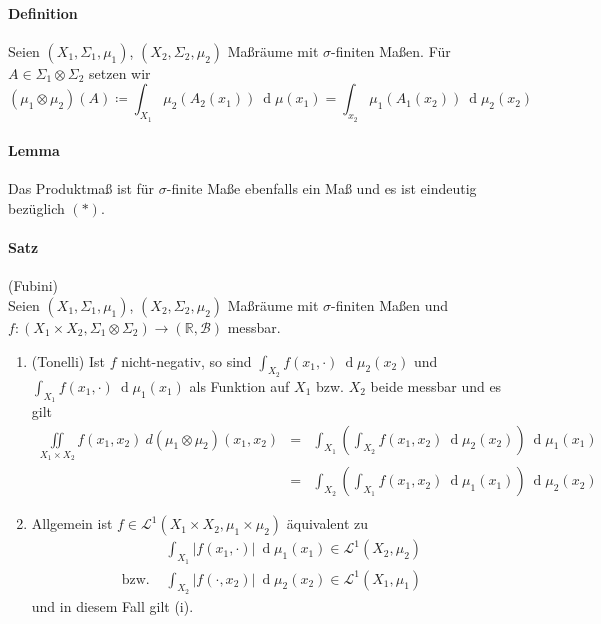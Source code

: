 \documentclass[12pt,a4paper,fleqn]{article}
\def\d{{\operatorname{d}}}
\begin{document}
\paragraph{Definition} Seien $(X_1, \Sigma_1, \mu_1)$, $(X_2, \Sigma_2, \mu_2)$ Maßräume mit $\sigma$-finiten Maßen. Für $A \in \Sigma_1 \otimes \Sigma_2$ setzen wir 
\begin{displaymath}
(\mu_1 \otimes \mu_2)(A) \coloneqq \int_{X_1} \mu_2(A_2(x_1))\ \d\mu(x_1) = \int_{x_2} \mu_1(A_1(x_2))\ \d\mu_2(x_2)
\end{displaymath}

\paragraph{Lemma} Das Produktmaß ist für $\sigma$-finite Maße ebenfalls ein Maß und es ist eindeutig bezüglich $(*)$.

\paragraph{Satz} (Fubini)\\
Seien $(X_1, \Sigma_1, \mu_1)$, $(X_2, \Sigma_2, \mu_2)$ Maßräume mit $\sigma$-finiten Maßen und\linebreak ${f\colon (X_1 \times X_2, \Sigma_1 \otimes \Sigma_2) \rightarrow (\mathbb{R}, \mathcal{B})}$ messbar.
\begin{enumerate}
\item (Tonelli) Ist $f$ nicht-negativ, so sind $\int_{X_2} f(x_1, \cdot)\ \d\mu_2(x_2)$ und $\int_{X_1} f(x_1, \cdot )\ \d\mu_1(x_1)$ als Funktion auf $X_1$ bzw. $X_2$ beide messbar und es gilt
\begin{align*}
\iint\limits_{X_1 \times X_2} f(x_1, x_2)\ d(\mu_1 \otimes \mu_2)(x_1, x_2) &=& \int_{X_1} \left(\int_{X_2} f(x_1, x_2)\ \d\mu_2(x_2)\right)\ \d\mu_1(x_1)\\
&=& \int_{X_2} \left(\int_{X_1} f(x_1, x_2)\ \d\mu_1(x_1)\right)\ \d\mu_2(x_2)
\end{align*}
\item Allgemein ist $f \in \mathscr{L}^1(X_1 \times X_2, \mu_1 \times \mu_2)$ äquivalent zu
\begin{align*}
&\int_{X_1} \vert f(x_1, \cdot) \vert\ \d\mu_1(x_1) \in \mathscr{L}^1(X_2, \mu_2)\\
\text{bzw. } & \int_{X_2} \vert f(\cdot, x_2) \vert\ \d\mu_2(x_2) \in \mathscr{L}^1(X_1, \mu_1)
\end{align*}
und in diesem Fall gilt (i).
\end{enumerate}
\end{document}
